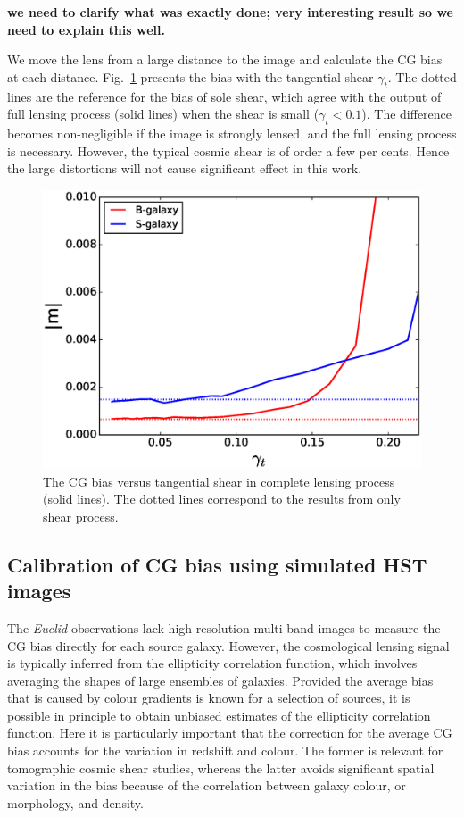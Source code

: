 \documentclass[useAMS,usenatbib]{mnras}
\begin{document}
{\bf we need to clarify what was exactly done; very interesting result so we need to explain this well.}

We move the lens from a large distance to the image and
calculate the CG bias at each distance. Fig.~\ref{fig:biasofgamma}
presents the bias with the tangential shear $\gamma_t$. The dotted
lines are the reference for the bias of sole shear, which agree with
the output of full lensing process (solid lines) when the shear is
small ($\gamma_t<0.1$). The difference becomes non-negligible if the
image is strongly lensed, and the full lensing process is necessary.
However, the typical cosmic shear is of order a few per cents. Hence
the large distortions will not cause significant effect in this work.


%
\begin{figure}
  \centerline{\includegraphics[width=\hsize]{zcg_sis.eps}}
  \caption{The CG bias versus tangential shear in complete lensing
    process (solid lines). The dotted lines correspond to the results
    from only shear process. }
  \label{fig:biasofgamma}
\end{figure}
%

\subsection{Calibration of CG bias using simulated HST images}
\label{sec:noisy}

The {\it Euclid} observations lack high-resolution multi-band images to measure the CG bias directly for each source galaxy. However, the cosmological lensing signal is typically inferred from the ellipticity correlation function, which involves  averaging the shapes of large ensembles of galaxies. Provided the average bias that is caused by colour gradients is known for a selection of sources, it is possible in principle to obtain unbiased estimates of the ellipticity correlation function. Here it is particularly important that the correction for the average CG bias accounts for the variation in redshift
and colour. The former is relevant for tomographic cosmic shear studies, whereas the latter avoids
significant spatial variation in the bias because of the correlation between galaxy colour, or morphology, and density.
\end{document}
